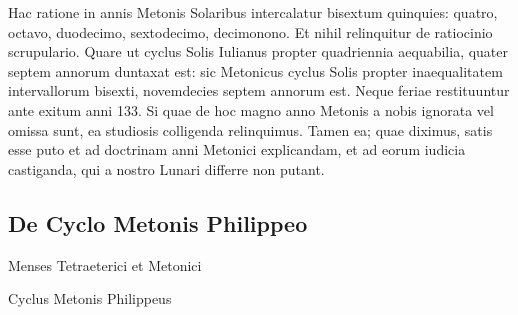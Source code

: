 Hac ratione in annis  Metonis Solaribus intercalatur bisextum
quinquies: quatro, octavo, duodecimo, sextodecimo, decimonono.
Et nihil relinquitur de ratiocinio scrupulario.
Quare ut cyclus
Solis Iulianus propter quadriennia aequabilia, quater septem annorum
duntaxat est: sic Metonicus cyclus Solis propter inaequalitatem
intervallorum bisexti, novemdecies septem annorum est.
Neque feriae
restituuntur ante exitum anni 133.
Si quae de hoc magno anno Metonis
a nobis ignorata vel omissa sunt, ea studiosis colligenda relinquimus.
Tamen ea; quae diximus, satis esse puto et ad doctrinam anni
Metonici explicandam, et ad eorum iudicia castiganda, qui a nostro
Lunari differre non putant.

\subsection{De Cyclo Metonis Philippeo}

\begin{table}[htbp]
 
 \caption{Menses Tetraeterici et Metonici}
 \label{tab:menses_tetraeterici}
\end{table}

\begin{table}[htb]
 
\caption{Cyclus Metonis Philippeus}
 \label{tab:cyclus_metonis_philippeus}
\end{table}

